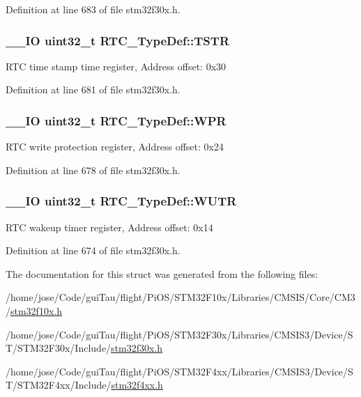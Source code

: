 Definition at line 683 of file stm32f30x.\-h.

\hypertarget{struct_r_t_c___type_def_a1ddbb2a5eaa54ff43835026dec99ae1c}{
\subsubsection[{T\-S\-T\-R}]{\setlength{\rightskip}{0pt plus 5cm}\-\_\-\-\_\-\-I\-O {\bf uint32\-\_\-t} R\-T\-C\-\_\-\-Type\-Def\-::\-T\-S\-T\-R}}\label{struct_r_t_c___type_def_a1ddbb2a5eaa54ff43835026dec99ae1c}
R\-T\-C time stamp time register, Address offset\-: 0x30 

Definition at line 681 of file stm32f30x.\-h.

\hypertarget{struct_r_t_c___type_def_ad54765af56784498a3ae08686b79a1ff}{
\subsubsection[{W\-P\-R}]{\setlength{\rightskip}{0pt plus 5cm}\-\_\-\-\_\-\-I\-O {\bf uint32\-\_\-t} R\-T\-C\-\_\-\-Type\-Def\-::\-W\-P\-R}}\label{struct_r_t_c___type_def_ad54765af56784498a3ae08686b79a1ff}
R\-T\-C write protection register, Address offset\-: 0x24 

Definition at line 678 of file stm32f30x.\-h.

\hypertarget{struct_r_t_c___type_def_ad93017bb0a778a2aad9cd71211fc770a}{
\subsubsection[{W\-U\-T\-R}]{\setlength{\rightskip}{0pt plus 5cm}\-\_\-\-\_\-\-I\-O {\bf uint32\-\_\-t} R\-T\-C\-\_\-\-Type\-Def\-::\-W\-U\-T\-R}}\label{struct_r_t_c___type_def_ad93017bb0a778a2aad9cd71211fc770a}
R\-T\-C wakeup timer register, Address offset\-: 0x14 

Definition at line 674 of file stm32f30x.\-h.



The documentation for this struct was generated from the following files\-:\begin{DoxyCompactItemize}
\item 
/home/jose/\-Code/gui\-Tau/flight/\-Pi\-O\-S/\-S\-T\-M32\-F10x/\-Libraries/\-C\-M\-S\-I\-S/\-Core/\-C\-M3/\hyperlink{stm32f10x_8h}{stm32f10x.\-h}\item 
/home/jose/\-Code/gui\-Tau/flight/\-Pi\-O\-S/\-S\-T\-M32\-F30x/\-Libraries/\-C\-M\-S\-I\-S3/\-Device/\-S\-T/\-S\-T\-M32\-F30x/\-Include/\hyperlink{stm32f30x_8h}{stm32f30x.\-h}\item 
/home/jose/\-Code/gui\-Tau/flight/\-Pi\-O\-S/\-S\-T\-M32\-F4xx/\-Libraries/\-C\-M\-S\-I\-S3/\-Device/\-S\-T/\-S\-T\-M32\-F4xx/\-Include/\hyperlink{stm32f4xx_8h}{stm32f4xx.\-h}\end{DoxyCompactItemize}
